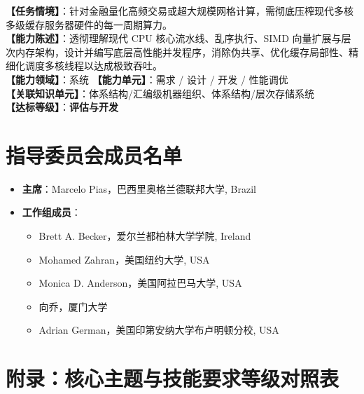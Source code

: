 \begin{taskbox}
\textbf{【任务情境】}：针对金融量化高频交易或超大规模网格计算，需彻底压榨现代多核多级缓存服务器硬件的每一周期算力。\\
\textbf{【能力陈述】}：透彻理解现代 CPU 核心流水线、乱序执行、SIMD 向量扩展与层次内存架构，设计并编写底层高性能并发程序，消除伪共享、优化缓存局部性、精细化调度多核线程以达成极致吞吐。\\
\textbf{【能力领域】}：系统 \quad \textbf{【能力单元】}：需求 / 设计 / 开发 / 性能调优\\
\textbf{【关联知识单元】}：体系结构/汇编级机器组织、体系结构/层次存储系统\\
\textbf{【达标等级】}：\textbf{评估与开发}
\end{taskbox}

\section{指导委员会成员名单}

\begin{itemize}
    \item \textbf{主席}：Marcelo Pias，巴西里奥格兰德联邦大学, Brazil
    \item \textbf{工作组成员}：
    \begin{itemize}
        \item Brett A. Becker，爱尔兰都柏林大学学院, Ireland
        \item Mohamed Zahran，美国纽约大学, USA
        \item Monica D. Anderson，美国阿拉巴马大学, USA
        \item 向乔，厦门大学
        \item Adrian German，美国印第安纳大学布卢明顿分校, USA
    \end{itemize}
\end{itemize}

\clearpage
\onecolumn
\section{附录：核心主题与技能要求等级对照表}

